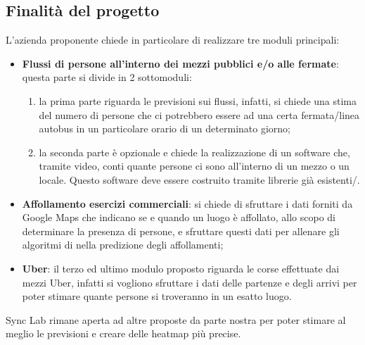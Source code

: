 \documentclass[../studio-di-fattibilita.tex]{subfiles}
\begin{document}
\subsection{Finalità del progetto}%
\label{sub:c3_finalita_del_progetto}
L’azienda proponente chiede in particolare di realizzare tre moduli principali:
\begin{itemize}
  \item \textbf{Flussi di persone all’interno dei mezzi pubblici e/o alle fermate}: questa parte si divide in 2 sottomoduli:
  \begin{enumerate}
    \item la prima parte riguarda le previsioni sui flussi, infatti, si chiede una stima del numero di persone che ci potrebbero essere ad una certa fermata/linea autobus in un particolare orario di un determinato giorno;
    \item la seconda parte è opzionale e chiede la realizzazione di un software che, tramite video, conti quante persone ci sono all'interno di un mezzo o un locale. Questo software deve essere costruito tramite librerie già esistenti/.
  \end{enumerate}
  \item \textbf{Affollamento esercizi commerciali}: si chiede di sfruttare i dati forniti da Google Maps che indicano se e quando un luogo è affollato, allo scopo di determinare la presenza di persone, e sfruttare questi dati per allenare gli algoritmi di  nella predizione degli affollamenti;
  \item \textbf{Uber}: il terzo ed ultimo modulo proposto riguarda le corse effettuate dai mezzi Uber, infatti si vogliono sfruttare i dati delle partenze e degli arrivi per poter stimare quante persone si troveranno in un esatto luogo.
\end{itemize}
Sync Lab rimane aperta ad altre proposte da parte nostra per poter stimare al meglio le previsioni e creare delle heatmap più precise.
\end{document}
